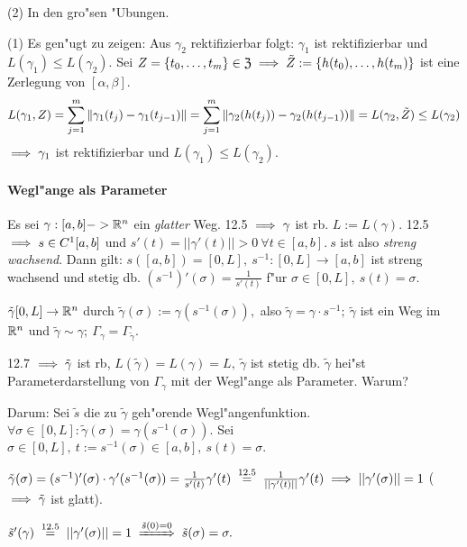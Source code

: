 \documentclass[a4paper,twoside,DIV15,BCOR12mm]{scrbook}
\begin{document}
\begin{beweise}
\item[(2)] In den gro"sen "Ubungen.
\item[(1)] Es gen"ugt zu zeigen: Aus $\gamma_2$ rektifizierbar folgt: $\gamma_1$ ist rektifizierbar und $L(\gamma_1)\le L(\gamma_2)$. Sei $Z=\{t_0,\ldots,t_m\}\in\mathfrak{Z}\implies\tilde{Z}:=\{h(t_0),\ldots, h(t_m)\}$ ist eine Zerlegung von $[\alpha,\beta]$.
$$L(\gamma_1, Z)=\displaystyle\sum_{j=1}^m\|\gamma_1(t_j)-\gamma_1(t_{j-1})\|=\displaystyle\sum_{j=1}^m\|\gamma_2(h(t_j))-\gamma_2(h(t_{j-1}))\|=L(\gamma_2, \tilde{Z})\le L(\gamma_2)$$
$\implies \gamma_1$ ist rektifizierbar und $L(\gamma_1)\le L(\gamma_2)$.
\end{beweise}

\paragraph{Wegl"ange als Parameter}
Es sei $\gamma:[a,b]->\mathbb{R}^n$ ein \emph{glatter} Weg. 12.5 $\implies \gamma$ ist rb. $L:=L(\gamma)$. 12.5 $\implies s \in C^1[a,b]$ und $s'(t) = ||\gamma'(t)|| > 0\ \forall t\in[a,b].\ s$ ist also \emph{streng wachsend}. Dann gilt: $s([a,b]) = [0,L],\ s^{-1}:[0,L]\to[a,b]$ ist streng wachsend und stetig db. $(s^{-1})'(\sigma) = \frac{1}{s'(t)}$ f"ur $\sigma \in [0,L],\ s(t) = \sigma.$

\begin{definition}
$\tilde{\gamma}[0,L] \to \mathbb{R}^n$ durch $\tilde{\gamma}(\sigma) := \gamma(s^{-1}(\sigma)),$ also $\tilde{\gamma} = \gamma\cdot s^{-1};\ \tilde{\gamma}$ ist ein Weg im $\mathbb{R}^n$ und $\tilde{\gamma} \sim \gamma;\ \Gamma_\gamma = \Gamma_{\tilde{\gamma}}.$

12.7 $\implies \tilde{\gamma}$ ist rb, $L(\tilde{\gamma})=L(\gamma)=L,\ \tilde{\gamma}$ ist stetig db. $\tilde{\gamma}$ hei"st Parameterdarstellung von $\Gamma_\gamma$ mit der Wegl"ange als Parameter. Warum?
\end{definition}

Darum: Sei $\tilde{s}$ die zu $\tilde{\gamma}$ geh"orende Wegl"angenfunktion. $\forall \sigma\in[0,L]: \tilde{\gamma}(\sigma) = \gamma(s^{-1}(\sigma)).$ Sei $\sigma\in[0,L],\ t:= s^{-1}(\sigma) \in [a,b],\ s(t) = \sigma.$

$\tilde{\gamma}(\sigma) = (s^{-1})'(\sigma)\cdot\gamma'(s^{-1}(\sigma)) = \frac{1}{s'(t)}\gamma'(t) \gleichnach{12.5} \frac{1}{||\gamma'(t)||}\gamma'(t) \folgt ||\gamma'(\sigma)||=1$ ($\implies \tilde{\gamma}$ ist glatt).

$\tilde{s}'(\gamma) \gleichnach{12.5} ||\gamma'(\sigma)|| = 1 \folgtwegen{\tilde{s}(0)=0} \tilde{s}(\sigma)=\sigma.$
\end{document}

